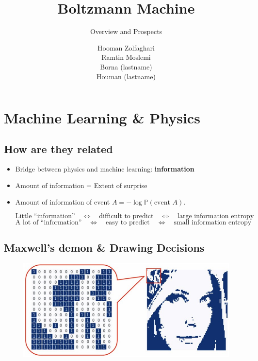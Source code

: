 \documentclass{antclass}
\title{Boltzmann Machine}
\subtitle{Overview and Prospects}
\author{Hooman Zolfaghari \\ Ramtin Moslemi \\ Borna (lastname) \\ Houman (lastname)}
\begin{document}
\maketitle
\chapter{Machine Learning \& Physics}

\section{How are they related}
\begin{itemize}
	\item Bridge between physics and machine learning:
	\textbf{information}
	\item Amount of information = Extent of surprise
	\item Amount of information of event \( A = - \log \mathbb{P}(\text{event }A) \).

	\[
	\text{Little ``information''} \quad \Leftrightarrow \quad \text{difficult to predict} \quad \Leftrightarrow \quad \text{large information entropy}
	\]
	\[
	\text{A lot of ``information''} \quad \Leftrightarrow \quad \text{easy to predict} \quad \Leftrightarrow \quad \text{small information entropy}
	\]
	
	
\end{itemize}

\section{Maxwell’s demon \& Drawing Decisions}

  \begin{figure}[ht]
	\centering
	\includegraphics[width=0.8\linewidth]{pics/MLandPhysics/drawing.jpg}
	\label{fig:drawing}
\end{figure}
\end{document}
